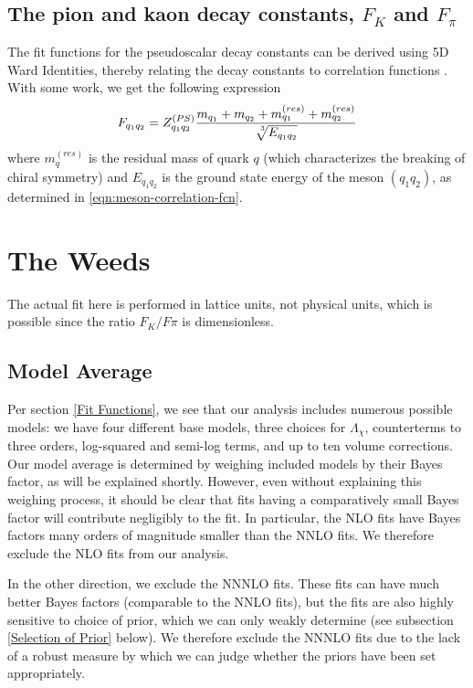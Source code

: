 \documentclass[prd,tightenlines,preprintnumbers,showpacs,superscriptaddress,notitlepage,eqsecnum,floatfix,notitlepage]{revtex4-1}
\begin{document}
\subsection{The pion and kaon decay constants, $F_K$ and $F_\pi$}
The fit functions for the pseudoscalar decay constants can be derived using 5D Ward Identities, thereby relating the decay constants to correlation functions \cite{Berkowitz:2017opd}. With some work, we get the following expression
\begin{equation}
F_{q_1 q_2} = Z^{(PS)}_{q_1 q_2}\frac{m_{q_1} + m_{q_2} + m^{(res)}_{q_1} + m^{(res)}_{q_2} }{\sqrt[\leftroot{-3}\uproot{3}3]{E_{q_1 q_2}}}
\end{equation}
where $m^{(res)}_q$ is the residual mass of quark $q$ (which characterizes the breaking of chiral symmetry) and $E_{q_1 q_2}$ is the ground state energy of the meson $(q_1 q_2)$, as determined in \eqref{eqn:meson-correlation-fcn}.



\section{The Weeds}
The actual fit here is performed in lattice units, not physical units, which is possible since the ratio $F_K / F\pi$ is dimensionless.

\subsection{Model Average}
Per section \ref{Fit Functions}, we see that our analysis includes numerous possible models: we have four different base models, three choices for $\Lambda_\chi$, counterterms to three orders, log-squared and semi-log terms, and up to ten volume corrections. Our model average is determined by weighing included models by their Bayes factor, as will be explained shortly. However, even without explaining this weighing process, it should be clear that fits having a comparatively small Bayes factor will contribute negligibly to the fit. In particular, the NLO fits have Bayes factors many orders of magnitude smaller than the NNLO fits. We therefore exclude the NLO fits from our analysis.

In the other direction, we exclude the NNNLO fits. These fits can have much better Bayes factors (comparable to the NNLO fits), but the fits are also highly sensitive to choice of prior, which we can only weakly determine (see subsection \ref{Selection of Prior} below). We therefore exclude the NNNLO fits due to the lack of a robust measure by which we can judge whether the priors have been set appropriately.
\end{document}
